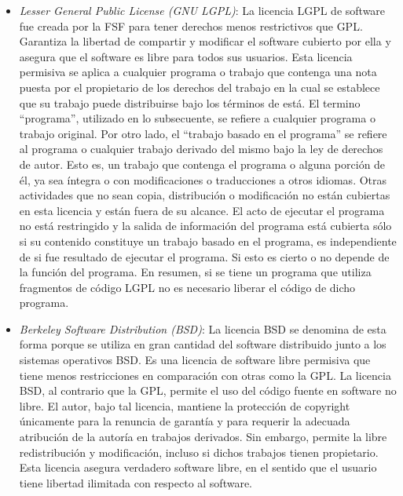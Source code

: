 \begin {itemize}
\item \textit{Lesser General Public License (GNU LGPL)}: La licencia
  LGPL de software fue creada por la FSF para tener derechos menos
  restrictivos que GPL. Garantiza la libertad de compartir y modificar
  el software cubierto por ella y asegura que el software es libre
  para todos sus usuarios. Esta licencia permisiva se aplica a
  cualquier programa o trabajo que contenga una nota puesta por el
  propietario de los derechos del trabajo en la cual se establece que
  su trabajo puede distribuirse bajo los términos de está. El
  termino ``programa'', utilizado en lo subsecuente, se refiere a
  cualquier programa o trabajo original. Por otro lado, el ``trabajo
  basado en el programa'' se refiere al programa o cualquier trabajo
  derivado del mismo bajo la ley de derechos de autor. Esto es, un
  trabajo que contenga el programa o alguna porción de él, ya sea
  íntegra o con modificaciones o traducciones a otros idiomas. Otras
  actividades que no sean copia, distribución o modificación no están
  cubiertas en esta licencia y están fuera de su alcance. El acto de
  ejecutar el programa no está restringido y la salida de información
  del programa está cubierta sólo si su contenido constituye un
  trabajo basado en el programa, es independiente de si fue resultado
  de ejecutar el programa. Si esto es cierto o no depende de la
  función del programa. En resumen, si se tiene un programa que
  utiliza fragmentos de código LGPL no es necesario liberar el código
  de dicho programa.

\item \textit{Berkeley Software Distribution (BSD)}: La licencia BSD se denomina de esta forma porque se utiliza en gran cantidad del
  software distribuido junto a los sistemas operativos BSD. Es una
  licencia de software libre permisiva que tiene menos restricciones
  en comparación con otras como la GPL. La licencia BSD, al contrario
  que la GPL, permite el uso del código fuente en software no
  libre. El autor, bajo tal licencia, mantiene la protección de
  copyright únicamente para la renuncia de garantía y para requerir la
  adecuada atribución de la autoría en trabajos derivados. Sin
  embargo, permite la libre redistribución y modificación, incluso si
  dichos trabajos tienen propietario. Esta licencia asegura verdadero
  software libre, en el sentido que el usuario tiene libertad
  ilimitada con respecto al software.
\end {itemize}



